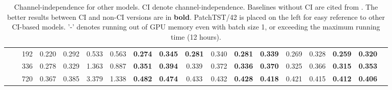 \documentclass{article} \usepackage{iclr2023_conference,times}
\begin{document}
\begin{table*}[t]
{\begin{tabular}{cc|c||cc||cc|cc|cc|cc|cc|ccc}
            &\multicolumn{1}{c|}{}& 192   & 0.220  & 0.292  & 0.533  & 0.563  & \textbf{0.274 } & \textbf{0.345 } & \textbf{0.281 } & 0.340  & \textbf{0.281 } & \textbf{0.339 } & 0.269  & 0.328  & \textbf{0.259 } & \textbf{0.320 } \\
            &\multicolumn{1}{c|}{}& 336   & 0.278  & 0.329  & 1.363  & 0.887  & \textbf{0.351 } & \textbf{0.394 } & 0.339  & 0.372  & \textbf{0.336 } & \textbf{0.370 } & 0.325  & 0.366  & \textbf{0.315 } & \textbf{0.353 } \\
            &\multicolumn{1}{c|}{}& 720   & 0.367  & 0.385  & 3.379  & 1.338  & \textbf{0.482 } & \textbf{0.474 } & 0.433  & 0.432  & \textbf{0.428 } & \textbf{0.418 } & 0.421  & 0.415  & \textbf{0.412 } & \textbf{0.406 } \\
			\cline{2-17}
		\end{tabular}
	}
	\caption{Channel-independence for other models. CI denote channel-independence. Baselines without CI are cited from \citet{dlinear}. The better results between CI and non-CI versions are in \textbf{bold}. PatchTST/42 is placed on the left for easy reference to other CI-based models. '-' denotes running out of GPU memory even with batch size 1, or exceeding the maximum running time (12 hours).}
	\label{tab:ciforothers}
\end{table*}
\linespread{1}
\end{document}
